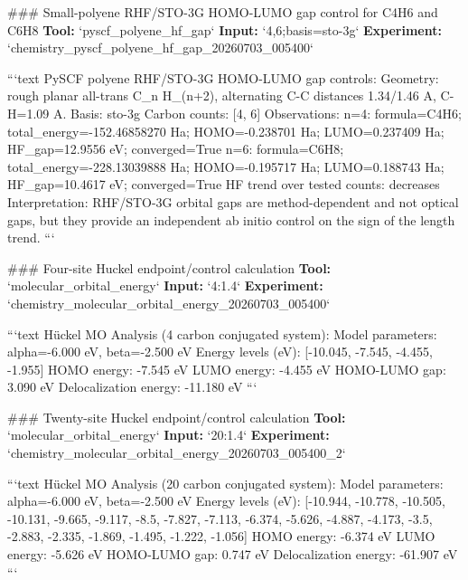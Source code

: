 \documentclass[11pt,a4paper]{article}
\begin{document}
\#\#\# Small-polyene RHF/STO-3G HOMO-LUMO gap control for C4H6 and C6H8
\textbf{Tool:} `pyscf\_polyene\_hf\_gap`
\textbf{Input:} `4,6;basis=sto-3g`
\textbf{Experiment:} `chemistry\_pyscf\_polyene\_hf\_gap\_20260703\_005400`

```text
PySCF polyene RHF/STO-3G HOMO-LUMO gap controls:
  Geometry: rough planar all-trans C\_n H\_(n+2), alternating C-C distances 1.34/1.46 A, C-H=1.09 A.
  Basis: sto-3g
  Carbon counts: [4, 6]
  Observations:
    n=4: formula=C4H6; total\_energy=-152.46858270 Ha; HOMO=-0.238701 Ha; LUMO=0.237409 Ha; HF\_gap=12.9556 eV; converged=True
    n=6: formula=C6H8; total\_energy=-228.13039888 Ha; HOMO=-0.195717 Ha; LUMO=0.188743 Ha; HF\_gap=10.4617 eV; converged=True
  HF trend over tested counts: decreases
  Interpretation: RHF/STO-3G orbital gaps are method-dependent and not optical gaps, but they provide an independent ab initio control on the sign of the length trend.
```

\#\#\# Four-site Huckel endpoint/control calculation
\textbf{Tool:} `molecular\_orbital\_energy`
\textbf{Input:} `4:1.4`
\textbf{Experiment:} `chemistry\_molecular\_orbital\_energy\_20260703\_005400`

```text
Hückel MO Analysis (4 carbon conjugated system):
  Model parameters: alpha=-6.000 eV, beta=-2.500 eV
  Energy levels (eV): [-10.045, -7.545, -4.455, -1.955]
  HOMO energy: -7.545 eV
  LUMO energy: -4.455 eV
  HOMO-LUMO gap: 3.090 eV
  Delocalization energy: -11.180 eV
```

\#\#\# Twenty-site Huckel endpoint/control calculation
\textbf{Tool:} `molecular\_orbital\_energy`
\textbf{Input:} `20:1.4`
\textbf{Experiment:} `chemistry\_molecular\_orbital\_energy\_20260703\_005400\_2`

```text
Hückel MO Analysis (20 carbon conjugated system):
  Model parameters: alpha=-6.000 eV, beta=-2.500 eV
  Energy levels (eV): [-10.944, -10.778, -10.505, -10.131, -9.665, -9.117, -8.5, -7.827, -7.113, -6.374, -5.626, -4.887, -4.173, -3.5, -2.883, -2.335, -1.869, -1.495, -1.222, -1.056]
  HOMO energy: -6.374 eV
  LUMO energy: -5.626 eV
  HOMO-LUMO gap: 0.747 eV
  Delocalization energy: -61.907 eV
```
\end{document}
